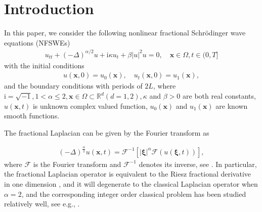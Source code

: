 \documentclass[preprint,compress,3p,10pt,fleqn]{elsarticle}
\numberwithin{equation}{section}
\begin{document}


\section{Introduction}\label{Section 1}
In this paper, we consider the following nonlinear fractional Schr{\"o}dinger wave equations (NFSWEs)
\begin{align}\label{eq_1}
u_{t t}+(-\Delta)^{\alpha / 2} u+\mathrm{i} \kappa u_{t}+\beta|u|^{2} u=0, \quad \boldsymbol{x} \in \Omega, t \in(0, T]
\end{align}
with the initial conditions
\begin{align}\label{eq_3}
u(\boldsymbol{x}, 0)=u_{0}(\boldsymbol{x}), \quad u_{t}(\boldsymbol{x}, 0)=u_{1}(\boldsymbol{x}),
\end{align}
and the boundary conditions with periods of $2L$,
where $\mathrm{i}=\sqrt{-1}, 1<\alpha \leq 2, \boldsymbol{x}\in \Omega \subset \mathbb{R}^d ( d=1,2), \kappa$ and $\beta>0$ are both real constants, $u(\boldsymbol{x}, t)$ is unknown complex valued function, $u_{0}(\boldsymbol{x})$ and $u_{1}(\boldsymbol{x})$ are known smooth functions. 

The fractional Laplacian can be given by the Fourier transform as

\begin{align}\label{eq_4}
	(-\Delta)^{\frac{\alpha}{2}} u(\boldsymbol{x},t)=\mathcal{F}^{-1}\left[|\boldsymbol{\xi}|^{\alpha} \mathcal{F}(u(\boldsymbol{\xi},t))\right],
	\end{align}
where $\mathcal{F}$ is the Fourier transform and $\mathcal{F}^{-1}$ denotes its inverse, see  \cite{caffarelliExtensionProblemRelated2007}.
In particular, the fractional Laplacian operator is equivalent to the Riesz fractional derivative in one dimension \cite{yangNumericalMethodsFractional2010,demengelFunctionalSpacesTheory2012}, and it will degenerate to the classical Laplacian operator when $\alpha=2$, and the corresponding integer order classical problem has been studied relatively well, see e.g., \cite{zhangConservativeNumericalScheme2003,baoUniformErrorEstimates2012,chengSeveralConservativeCompact2018,brugnanoClassEnergyconservingHamiltonian2018}.
\end{document}
